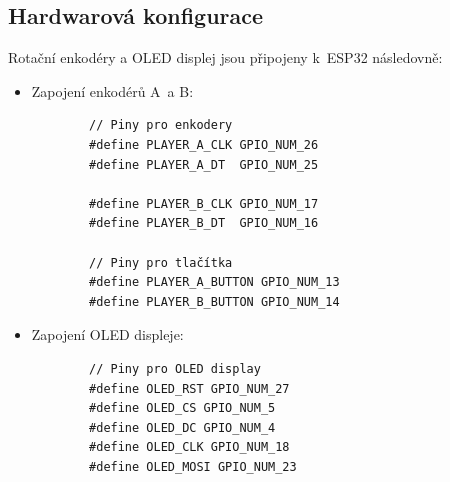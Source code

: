 \documentclass[a4paper,11pt]{article}
\begin{document}
\subsection{Hardwarová konfigurace} \noindent
Rotační enkodéry a OLED displej jsou připojeny k~ESP32 následovně:
\begin{itemize}
    \item Zapojení enkodérů A~a B:\\ 
    \begin{verbatim}
        // Piny pro enkodery
        #define PLAYER_A_CLK GPIO_NUM_26
        #define PLAYER_A_DT  GPIO_NUM_25

        #define PLAYER_B_CLK GPIO_NUM_17
        #define PLAYER_B_DT  GPIO_NUM_16

        // Piny pro tlačítka
        #define PLAYER_A_BUTTON GPIO_NUM_13
        #define PLAYER_B_BUTTON GPIO_NUM_14
    \end{verbatim}
    \item Zapojení OLED displeje:\\
    \begin{verbatim}
        // Piny pro OLED display
        #define OLED_RST GPIO_NUM_27
        #define OLED_CS GPIO_NUM_5
        #define OLED_DC GPIO_NUM_4
        #define OLED_CLK GPIO_NUM_18
        #define OLED_MOSI GPIO_NUM_23
    \end{verbatim}
\end{itemize}
\end{document}
